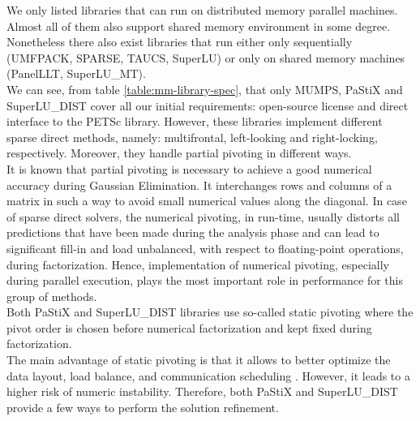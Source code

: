 We only listed libraries that can run on distributed memory parallel machines. Almost all of them also support shared memory environment in some degree. Nonetheless there also exist libraries that  run either only sequentially (UMFPACK, SPARSE, TAUCS, SuperLU) or only on shared memory machines (PanelLLT, SuperLU\_MT).\\





We can see, from table \ref{table:mm-library-spec}, that only MUMPS, PaStiX and SuperLU\_DIST cover all our initial requirements: open-source license and direct interface to the PETSc library. However, these libraries implement different sparse direct methods, namely: multifrontal, left-looking and right-locking, respectively. Moreover, they handle partial pivoting in different ways.\\


It is known that partial pivoting is necessary to achieve a good numerical accuracy during Gaussian Elimination. It interchanges rows and columns of a matrix in such a way to avoid small numerical values along the diagonal. In case of sparse direct solvers, the numerical pivoting, in run-time, usually distorts all predictions that have been made during the analysis phase and can lead to significant fill-in and load unbalanced, with respect to floating-point operations, during factorization. Hence, implementation of numerical pivoting, especially during parallel execution, plays the most important role in performance for this group of methods.\\


Both PaStiX and SuperLU\_DIST libraries use so-called static pivoting where the pivot order is chosen before numerical factorization and kept fixed during factorization.\\


The main advantage of static pivoting is that it allows to better optimize the data layout, load balance, and communication scheduling \cite{superlu-manual}. However, it leads to a higher risk of numeric instability. Therefore, both PaStiX and SuperLU\_DIST provide a few ways to perform the solution refinement.\\


